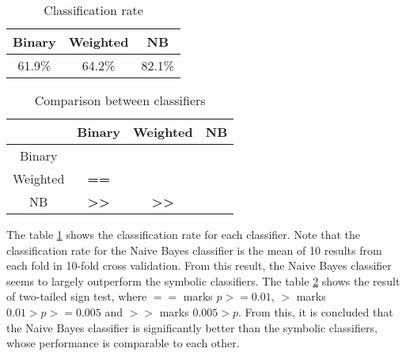 \begin{table}[]
\centering
\caption{Classification rate}
\label{tab:crate}
\begin{tabular}{|c|c|c|}
\hline
Binary & Weighted & NB     \\ \hline
61.9\% & 64.2\%   & 82.1\% \\ \hline
\end{tabular}
\end{table}
\begin{table}[]
\centering
\caption{Comparison between classifiers}
\label{tab:comp}
\begin{tabular}{|c|c|c|c|}
\hline
\textbf{} & Binary                            & Weighted                          & NB        \\ \hline
Binary    & \textbf{}                         & \textbf{}                         & \textbf{} \\ \hline
Weighted  & \textbf{==}                       & \textbf{}                         & \textbf{} \\ \hline
NB        & \textbf{\textgreater\textgreater} & \textbf{\textgreater\textgreater} & \textbf{} \\ \hline
\end{tabular}
\end{table}
The table \ref{tab:crate} shows the classification rate for each classifier. Note that the classification rate for the Naive Bayes classifier is the mean of 10 results from each fold in 10-fold cross validation.
From this result, the Naive Bayes classifier seems to largely outperform the symbolic classifiers.
The table \ref{tab:comp} shows the result of two-tailed sign test, where $==$ marks $p >= 0.01$, $>$ marks $0.01 > p >= 0.005$ and  $>>$ marks $0.005 > p$.
From this, it is concluded that the Naive Bayes classifier is significantly better than the symbolic classifiers, whose performance is comparable to each other.